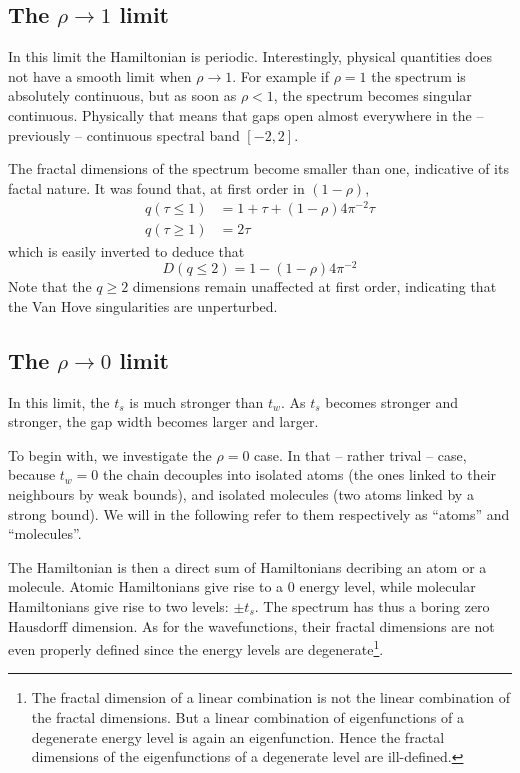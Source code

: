 \documentclass[11pt]{article}
\begin{document}
\subsection{The $\rho \rightarrow 1$ limit}

In this limit the Hamiltonian is periodic. Interestingly, physical quantities does not have a smooth limit when $\rho \rightarrow 1$. 
For example if $\rho = 1$ the spectrum is absolutely continuous, but as soon as $\rho < 1$, the spectrum becomes singular continuous. Physically that means that gaps open almost everywhere in the -- previously -- continuous spectral band $[-2,2]$.

The fractal dimensions of the spectrum become smaller than one, indicative of its factal nature.
It was found \cite{Rudinger1996} that, at first order in $(1-\rho)$,
\begin{align}
	q(\tau \leq 1) &= 1+\tau + (1-\rho)4 \pi^{-2} \tau \\
	q(\tau \geq 1) &= 2 \tau
\end{align}
which is easily inverted to deduce that
\begin{equation}
	D(q \leq 2) = 1 - (1-\rho)4 \pi^{-2}
\end{equation}
Note that the $q \geq 2$ dimensions remain unaffected at first order, indicating that the Van Hove singularities are unperturbed.

\subsection{The $\rho \rightarrow 0$ limit}

In this limit, the $t_s$ is much stronger than $t_w$.
As $t_s$ becomes stronger and stronger, the gap width becomes larger and larger. 

To begin with, we investigate the $\rho = 0$ case. 
In that -- rather trival -- case, because $t_w = 0$ the chain decouples into isolated atoms (the ones linked to their neighbours by weak bounds), and isolated molecules (two atoms linked by a strong bound). We will in the following refer to them respectively as ``atoms'' and ``molecules''.

The Hamiltonian is then a direct sum of Hamiltonians decribing an atom or a molecule. Atomic Hamiltonians give rise to a $0$ energy level, while molecular Hamiltonians give rise to two levels: $\pm t_s$.
The spectrum has thus a boring zero Hausdorff dimension. As for the wavefunctions, their fractal dimensions are not even properly defined since the energy levels are degenerate\footnote{The fractal dimension of a linear combination is not the linear combination of the fractal dimensions. But a linear combination of eigenfunctions of a degenerate energy level is again an eigenfunction. Hence the fractal dimensions of the eigenfunctions of a degenerate level are ill-defined.}.
\end{document}

